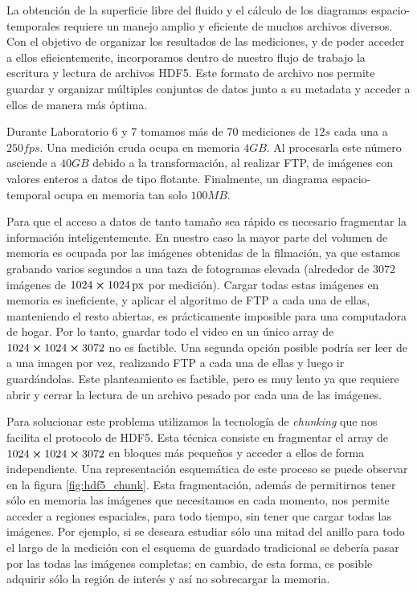 \documentclass[../main.tex]{subfiles}
\begin{document}
La obtención de la superficie libre del fluido y el cálculo de los diagramas espacio-temporales requiere un manejo amplio y eficiente de muchos archivos diversos. Con el objetivo de organizar los resultados de las mediciones, y de poder acceder a ellos eficientemente, incorporamos dentro de nuestro flujo de trabajo la escritura y lectura de archivos HDF5. Este formato de archivo nos permite guardar y organizar múltiples conjuntos de datos junto a su metadata y acceder a ellos de manera más óptima.

Durante Laboratorio 6 y 7 tomamos más de 70 mediciones de $12 \si{s}$ cada una a $250 \si{fps}$. Una medición cruda ocupa en memoria $4\si{GB}$. Al procesarla este número asciende a $40\si{GB}$ debido a la transformación, al realizar FTP, de imágenes con valores enteros a datos de tipo flotante. Finalmente, un diagrama espacio-temporal ocupa en memoria tan solo $100\si{MB}$.

Para que el acceso a datos de tanto tamaño sea rápido es necesario fragmentar la información inteligentemente. En nuestro caso la mayor parte del volumen de memoria es ocupada por las imágenes obtenidas de la filmación, ya que estamos grabando varios segundos a una taza de fotogramas elevada (alrededor de $3072$ imágenes de $1024\cross 1024 \, \si{px}$ por medición). Cargar todas estas imágenes en memoria es ineficiente, y aplicar el algoritmo de FTP a cada una de ellas, manteniendo el resto abiertas, es prácticamente imposible para una computadora de hogar. Por lo tanto, guardar todo el video en un único array de $1024 \cross 1024 \cross 3072$ no es factible. Una segunda opción posible podría ser leer de a una imagen por vez, realizando FTP a cada una de ellas y luego ir guardándolas. Este planteamiento es factible, pero es muy lento ya que requiere abrir y cerrar la lectura de un archivo pesado por cada una de las imágenes.

Para solucionar este problema utilizamos la tecnología de \textit{chunking} que nos facilita el protocolo de HDF5. Esta técnica consiste en fragmentar el array de $1024 \cross 1024 \cross 3072$ en bloques más pequeños y acceder a ellos de forma independiente. Una representación esquemática de este proceso se puede observar en la figura \ref{fig:hdf5_chunk}. Esta fragmentación, además de permitirnos tener sólo en memoria las imágenes que necesitamos en cada momento, nos permite acceder a regiones espaciales, para todo tiempo, sin tener que cargar todas las imágenes. Por ejemplo, si se deseara estudiar sólo una mitad del anillo para todo el largo de la medición con el esquema de guardado tradicional se debería pasar por las todas las imágenes completas; en cambio, de esta forma, es posible adquirir sólo la región de interés y así no sobrecargar la memoria.
\end{document}
